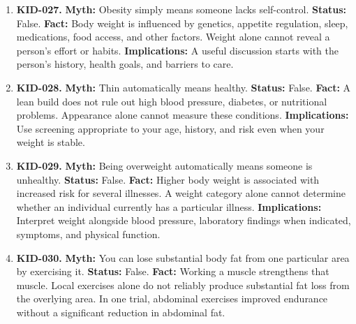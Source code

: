 \documentclass[11pt,oneside]{book}
\begin{document}
\begin{enumerate}[leftmargin=0pt,labelwidth=0pt,labelsep=0pt,itemindent=0pt]
\textbf{Status:} False.\newline
\textbf{Fact:} Seeds have occasionally been found in removed appendices. Such findings are rare and do not establish swallowed fruit seeds as a common cause of appendicitis. \cite{ref210,ref353}\newline
\textbf{Implications:} An accidentally swallowed small edible seed usually needs no action. Persistent or worsening abdominal pain should be assessed on its own merits.
\item[] \textbf{KID-027.} \textbf{Myth:} Obesity simply means someone lacks self-control.\newline
\textbf{Status:} False.\newline
\textbf{Fact:} Body weight is influenced by genetics, appetite regulation, sleep, medications, food access, and other factors. Weight alone cannot reveal a person's effort or habits. \cite{ref354}\newline
\textbf{Implications:} A useful discussion starts with the person's history, health goals, and barriers to care.
\item[] \textbf{KID-028.} \textbf{Myth:} Thin automatically means healthy.\newline
\textbf{Status:} False.\newline
\textbf{Fact:} A lean build does not rule out high blood pressure, diabetes, or nutritional problems. Appearance alone cannot measure these conditions. \cite{ref354,ref300}\newline
\textbf{Implications:} Use screening appropriate to your age, history, and risk even when your weight is stable.
\item[] \textbf{KID-029.} \textbf{Myth:} Being overweight automatically means someone is unhealthy.\newline
\textbf{Status:} False.\newline
\textbf{Fact:} Higher body weight is associated with increased risk for several illnesses. A weight category alone cannot determine whether an individual currently has a particular illness. \cite{ref354}\newline
\textbf{Implications:} Interpret weight alongside blood pressure, laboratory findings when indicated, symptoms, and physical function.
\item[] \textbf{KID-030.} \textbf{Myth:} You can lose substantial body fat from one particular area by exercising it.\newline
\textbf{Status:} False.\newline
\textbf{Fact:} Working a muscle strengthens that muscle. Local exercises alone do not reliably produce substantial fat loss from the overlying area. In one trial, abdominal exercises improved endurance without a significant reduction in abdominal fat. \cite{ref305}\newline

\end{enumerate}
\end{document}
